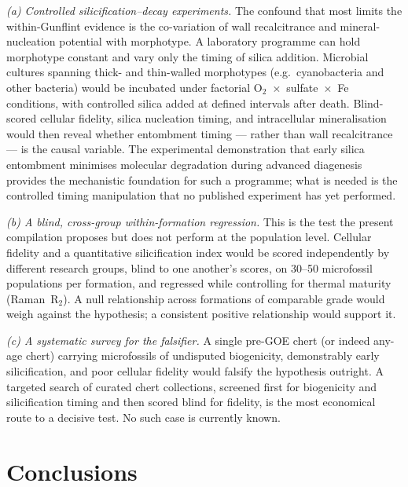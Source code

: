 \documentclass[11pt]{article}
\begin{document}
\textit{(a) Controlled silicification--decay experiments.} The confound that most limits the
within-Gunflint evidence is the co-variation of wall recalcitrance and mineral-nucleation potential
with morphotype. A laboratory programme can hold morphotype constant and vary only the timing of
silica addition. Microbial cultures spanning thick- and thin-walled morphotypes (e.g.\ cyanobacteria
and other bacteria) would be incubated under factorial O$_2$~$\times$~sulfate~$\times$~Fe conditions,
with controlled silica added at defined intervals after death. Blind-scored cellular fidelity, silica
nucleation timing, and intracellular mineralisation would then reveal whether entombment timing ---
rather than wall recalcitrance --- is the causal variable. The experimental demonstration that early
silica entombment minimises molecular degradation during advanced diagenesis \citep{Alleon2016b}
provides the mechanistic foundation for such a programme; what is needed is the controlled timing
manipulation that no published experiment has yet performed.

\textit{(b) A blind, cross-group within-formation regression.} This is the test the present
compilation proposes but does not perform at the population level. Cellular fidelity and a
quantitative silicification index would be scored independently by different research groups, blind
to one another's scores, on 30--50 microfossil populations per formation, and regressed while
controlling for thermal maturity (Raman~R$_2$). A null relationship across formations of comparable
grade would weigh against the hypothesis; a consistent positive relationship would support it.

\textit{(c) A systematic survey for the falsifier.} A single pre-GOE chert (or indeed any-age chert)
carrying microfossils of undisputed biogenicity, demonstrably early silicification, and poor cellular
fidelity would falsify the hypothesis outright. A targeted search of curated chert collections,
screened first for biogenicity and silicification timing and then scored blind for fidelity, is the
most economical route to a decisive test. No such case is currently known.

\section{Conclusions}
\end{document}
